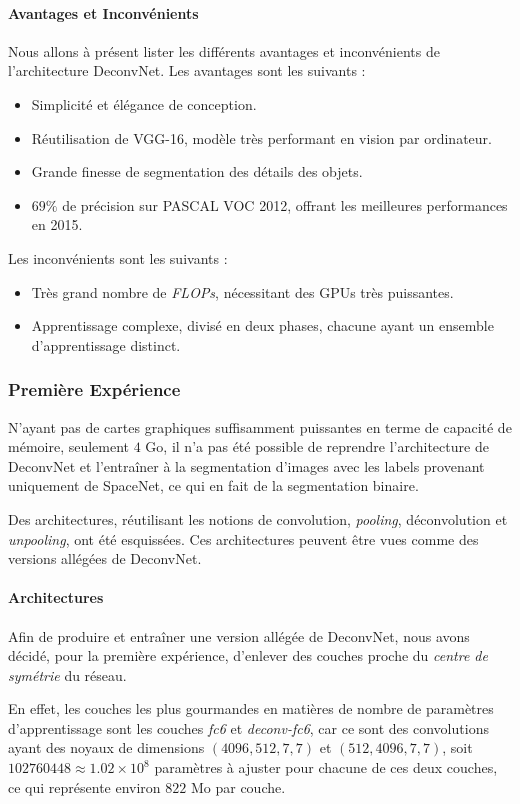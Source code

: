 \documentclass[a4paper, 11pt]{report}
\begin{document}
\paragraph{Avantages et Inconvénients}
Nous allons à présent lister les différents avantages et inconvénients de l'architecture DeconvNet.
Les avantages sont les suivants :
\begin{itemize}
	\item Simplicité et élégance de conception.
	\item Réutilisation de VGG-16, modèle très performant en vision par ordinateur.
	\item Grande finesse de segmentation des détails des objets.
	\item $69\%$ de précision sur PASCAL VOC 2012, offrant les meilleures performances en 2015.
\end{itemize}
Les inconvénients sont les suivants :
\begin{itemize}
	\item Très grand nombre de \emph{FLOPs}, nécessitant des GPUs très puissantes.
	\item Apprentissage complexe, divisé en deux phases, chacune ayant un ensemble d'apprentissage distinct.
\end{itemize}

\subsubsection{Première Expérience}
N'ayant pas de cartes graphiques suffisamment puissantes en terme de capacité de mémoire, seulement $4$ Go, il n'a pas été possible de reprendre l'architecture de DeconvNet et l'entraîner à la segmentation d'images avec les labels provenant uniquement de SpaceNet, ce qui en fait de la segmentation binaire.

Des architectures, réutilisant les notions de convolution, \emph{pooling}, déconvolution et \emph{unpooling}, ont été esquissées.
Ces architectures peuvent être vues comme des versions allégées de DeconvNet.

\paragraph{Architectures}
Afin de produire et entraîner une version allégée de DeconvNet, nous avons décidé, pour la première expérience, d'enlever des couches proche du \emph{centre de symétrie} du réseau.

En effet, les couches les plus gourmandes en matières de nombre de paramètres d'apprentissage sont les couches \emph{fc6} et \emph{deconv-fc6}, car ce sont des convolutions ayant des noyaux de dimensions $(4096, 512, 7, 7)$ et $(512, 4096, 7, 7)$, soit $102760448 \approx 1.02 \times 10^8$ paramètres à ajuster pour chacune de ces deux couches, ce qui représente environ $822$ Mo par couche.
\end{document}
